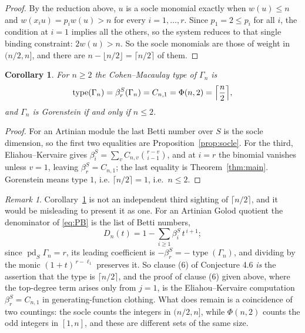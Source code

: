 \documentclass[a4paper,11pt,oneside,reqno]{amsart}
\theoremstyle{definition}
\theoremstyle{remark}
\newtheorem{remark}[definition]{Remark}
\theoremstyle{plain}
\newtheorem{corollary}[definition]{Corollary}
\newcommand{\Gam}{\Gamma}
\begin{document}
\begin{proof}
  By the reduction above, \(u\) is a socle monomial exactly when \(w(u) \le n\)
  and \(w(x_iu) = p_iw(u) > n\) for every \(i = 1,\dots,r\). Since \(p_1 = 2 \le p_i\)
  for all \(i\), the condition at \(i = 1\) implies all the others, so the system
  reduces to that single binding constraint: \(2w(u) > n\). So the socle monomials are those of weight
  in \((n/2,n]\), and there are \(n-\lfloor n/2\rfloor = \lceil n/2\rceil\)
  of them.
\end{proof}

\begin{corollary}\label{cor:type}
  For \(n \ge 2\) the Cohen--Macaulay type of \(\Gam_n\) is
  \begin{equation}\label{eq:type}
    \operatorname{type}(\Gam_n) = \beta^{S}_{r}(\Gam_n)
      =C_{n,1} = \Phi(n,2) = \Bigl\lceil\frac{n}{2}\Bigr\rceil,
  \end{equation}
  and \(\Gam_n\) is Gorenstein if and only if \(n \le 2\).
\end{corollary}

\begin{proof}
  For an Artinian module the last Betti number over \(S\) is the socle
  dimension, so the first two equalities are Proposition~\ref{prop:socle}. For
  the third, Eliahou--Kervaire gives
  \(\beta^{S}_{i} = \sum_{v}C_{n,v}\binom{r-v}{i-1}\), and at \(i = r\) the
  binomial vanishes unless \(v = 1\), leaving \(\beta^{S}_{r} = C_{n,1}\); the last
  equality is Theorem~\ref{thm:main}. Gorenstein means type \(1\), i.e.
  \(\lceil n/2\rceil = 1\), i.e.\ \(n \le 2\).
\end{proof}

\begin{remark}
  Corollary~\ref{cor:type} is not an independent third sighting of
  \(\lceil n/2\rceil\), and it would be misleading to present it as one.
  For an Artinian Golod quotient the denominator of \eqref{eq:PB} is the list
  of Betti numbers,
  \[
    D_n(t) = 1-\sum_{i \ge 1}\beta^{S}_{i}\,t^{\,i+1};
  \]
  since \(\operatorname{pd}_S\Gam_n = r\), its leading coefficient is
  \(-\beta^{S}_{r} = -\operatorname{type}(\Gam_n)\), and dividing by the monic
  \((1+t)^{\,r-\ell_1}\) preserves it. So clause (6) of Conjecture 4.6
  \emph{is} the assertion that the type is \(\lceil n/2\rceil\), and the proof
  of clause (6) given above, where the top-degree term arises only from
  \(j = 1\), is the Eliahou--Kervaire computation \(\beta^{S}_{r} = C_{n,1}\)
  in generating-function clothing. What does remain is a coincidence of
  two countings: the socle counts the integers in \((n/2,n]\), while
  \(\Phi(n,2)\) counts the odd integers in \([1,n]\), and these are different sets
  of the same size.
\end{remark}
\end{document}
